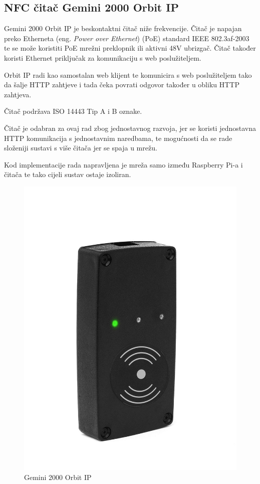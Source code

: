 \documentclass[times, utf8, zavrsni]{fer}
\begin{document}
\subsection{NFC čitač Gemini 2000 Orbit IP}
Gemini 2000 Orbit IP \citep{11} je beskontaktni čitač niže frekvencije. Čitač je napajan preko Etherneta (eng. \textit{Power over Ethernet}) (PoE) standard IEEE 802.3af-2003 te se može koristiti PoE mrežni preklopnik ili aktivni 48V ubrizgač. Čitač također koristi Ethernet priključak za komunikaciju s web poslužiteljem. \par
Orbit IP radi kao samostalan web klijent te komunicira s web poslužiteljem tako da šalje HTTP zahtjeve i tada čeka povrati odgovor također u obliku HTTP zahtjeva. \par 
Čitač podržava ISO 14443 Tip A i B oznake.\par 
Čitač je odabran za ovaj rad zbog jednostavnog razvoja, jer se koristi jednostavna HTTP komunikacija s jednostavnim naredbama, te mogućnosti da se rade složeniji sustavi s više čitača jer se spaja u mrežu.\par
Kod implementacije rada napravljena je mreža samo između Raspberry Pi-a i čitača te tako cijeli sustav ostaje izoliran.


\begin{figure}[H]
\includegraphics[scale=0.2]{orbit.jpg}
\centering
\caption{Gemini 2000 Orbit IP}
\centering
\end{figure}
\end{document}
